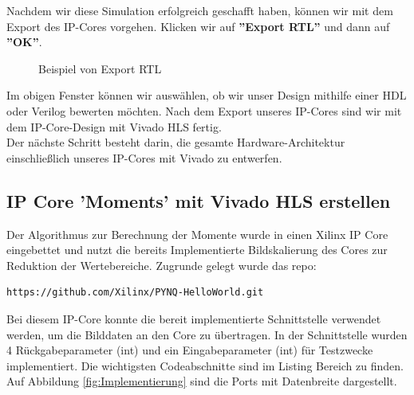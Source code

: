 \documentclass[a4paper]{report}
\begin{document}
Nachdem wir diese Simulation erfolgreich geschafft haben, können wir mit dem Export des IP-Cores vorgehen.
Klicken wir auf \textbf{''Export RTL''} und dann auf \textbf{''OK''}.\\

\begin{figure}[H]
\centering
{}
\caption{Beispiel von Export RTL}
\label{fig:Export_RTL}
\end{figure}


Im obigen Fenster können wir auswählen, ob wir unser Design mithilfe einer HDL oder Verilog bewerten möchten.
Nach dem Export unseres IP-Cores sind wir mit dem IP-Core-Design mit Vivado HLS fertig.\\

Der nächste Schritt besteht darin, die gesamte Hardware-Architektur einschließlich unseres IP-Cores mit Vivado zu entwerfen.

\subsection{IP Core 'Moments' mit Vivado HLS erstellen}

Der Algorithmus zur Berechnung der Momente wurde in einen Xilinx IP Core eingebettet und nutzt die bereits Implementierte Bildskalierung des Cores zur Reduktion der Wertebereiche. Zugrunde gelegt wurde das repo:

\begin{verbatim}
https://github.com/Xilinx/PYNQ-HelloWorld.git
\end{verbatim}

Bei diesem IP-Core konnte die bereit implementierte Schnittstelle verwendet werden, um die Bilddaten an den Core zu übertragen. In der Schnittstelle wurden 4 Rückgabeparameter (int) und ein Eingabeparameter (int) für Testzwecke implementiert. Die wichtigsten Codeabschnitte sind im Listing Bereich zu finden. Auf Abbildung \ref{fig:Implementierung} sind die Ports mit Datenbreite dargestellt.
\end{document}
